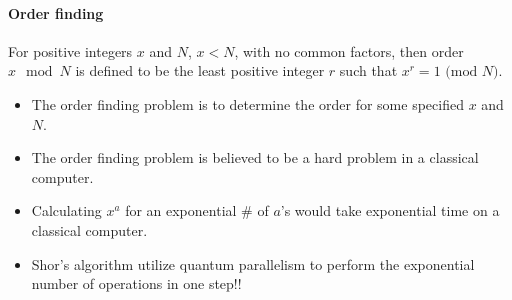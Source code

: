 \documentclass[]{book}
\theoremstyle{nonumberplain}
\begin{document}
\paragraph{Order finding} For positive integers $x$ and $N$, $x<N$, with no common factors, then order $x\mod{N}$ is defined to be the least positive integer $r$ such that  $x^{r}=1 \text{ (mod } N)$.
\begin{itemize}
	\item The order finding problem is to determine the order for some specified $x$ and $N$.
	\item The order finding problem is believed to be a hard problem in a classical computer.
	\item Calculating $x^{a}$ for an exponential $\#$ of $a$'s would take exponential time on a classical computer.
	\item Shor's algorithm utilize quantum parallelism to perform the exponential number of operations in one step!! 
\end{itemize}
\end{document}

